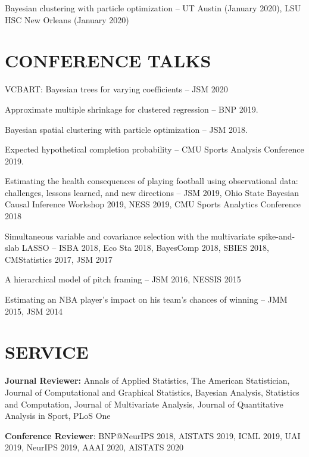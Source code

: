 \documentclass[margin]{res}
\begin{document}
\begin{resume}
Bayesian clustering with particle optimization -- UT Austin (January 2020), LSU HSC New Orleans (January 2020)

\section{CONFERENCE \hspace{0.1in} TALKS}

VCBART: Bayesian trees for varying coefficients -- JSM 2020

Approximate multiple shrinkage for clustered regression -- BNP 2019.

Bayesian spatial clustering with particle optimization -- JSM 2018. 

Expected hypothetical completion probability -- CMU Sports Analysis Conference 2019.

Estimating the health consequences of playing football using observational data: challenges, lessons learned, and new directions -- JSM 2019, Ohio State Bayesian Causal Inference Workshop 2019, NESS 2019, CMU Sports Analytics Conference 2018

Simultaneous variable and covariance selection with the multivariate spike-and-slab LASSO -- ISBA 2018, Eco Sta 2018, BayesComp 2018, SBIES 2018, CMStatistics 2017, JSM 2017

A hierarchical model of pitch framing -- JSM 2016, NESSIS 2015

Estimating an NBA player's impact on his team's chances of winning -- JMM 2015, JSM 2014

\section{SERVICE}
\textbf{Journal Reviewer:} Annals of Applied Statistics, The American Statistician, Journal of Computational and Graphical Statistics, Bayesian Analysis, Statistics and Computation, Journal of Multivariate Analysis, Journal of Quantitative Analysis in Sport, PLoS One

\textbf{Conference Reviewer}: BNP@NeurIPS 2018, AISTATS 2019, ICML 2019, UAI 2019, NeurIPS 2019, AAAI 2020, AISTATS 2020

\end{resume} 
\end{document}
